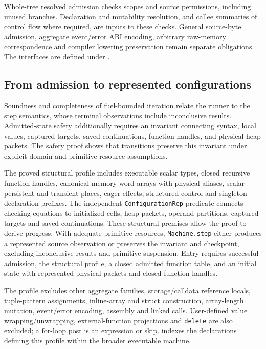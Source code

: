 \documentclass[conference]{IEEEtran}
\newcommand{\code}[1]{\texttt{#1}}
\begin{document}
Whole-tree resolved admission checks scopes and source permissions, including
unused branches. Declaration and mutability resolution, and callee summaries
of control flow where required, are inputs to these checks. General source-byte
admission, aggregate event/error ABI encoding, arbitrary raw-memory
correspondence and compiler lowering preservation remain separate obligations.
The interfaces are defined under .

\subsection{From admission to represented configurations}
Soundness and completeness of fuel-bounded iteration relate the runner to the
step semantics, whose terminal observations include inconclusive results.
Admitted-state safety additionally requires an invariant connecting syntax,
local values, captured targets, saved continuations, function handles, and
physical heap packets. The safety proof shows that transitions preserve this
invariant under explicit domain and primitive-resource assumptions.

The proved structural profile includes executable scalar types, closed recursive function
handles, canonical memory word arrays with physical aliases, scalar persistent
and transient places, eager effects, structured control and singleton
declaration prefixes. The independent \code{ConfigurationRep} predicate connects
checking equations to initialized cells, heap packets, operand partitions,
captured targets and saved continuations. These structural premises allow the
proof to derive progress. With adequate primitive resources,
\code{Machine.step} either produces a represented source observation or preserves
the invariant and checkpoint, excluding inconclusive results and primitive
suspension. Entry requires successful admission, the structural profile, a
closed admitted function table, and an initial state with represented physical
packets and closed function handles.

The profile excludes other aggregate families, storage/calldata reference
locals, tuple-pattern assignments, inline-array and struct construction,
array-length mutation, event/error encoding, assembly and linked calls.
User-defined value wrapping/unwrapping, external-function projections and
\code{delete} are also excluded; a for-loop post is an expression or skip.
 indexes the declarations defining this profile within the
broader executable machine.
\end{document}
